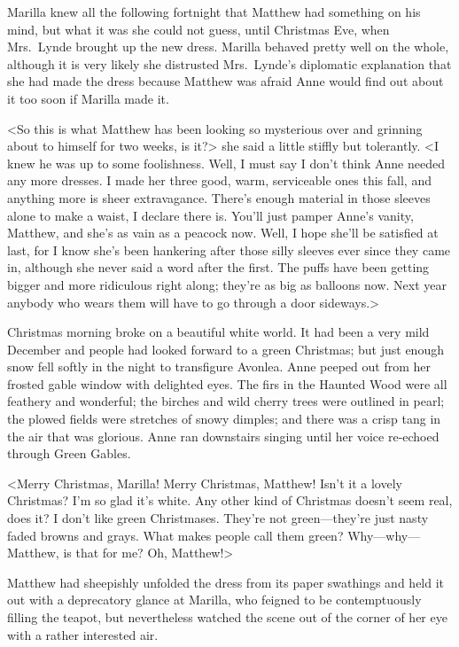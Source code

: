 Marilla knew all the following fortnight that Matthew had something on his mind, but what it was she could not guess, until Christmas Eve, when Mrs.~Lynde brought up the new dress. Marilla behaved pretty well on the whole, although it is very likely she distrusted Mrs.~Lynde's diplomatic explanation that she had made the dress because Matthew was afraid Anne would find out about it too soon if Marilla made it.

<So this is what Matthew has been looking so mysterious over and grinning about to himself for two weeks, is it?> she said a little stiffly but tolerantly. <I knew he was up to some foolishness. Well, I must say I don't think Anne needed any more dresses. I made her three good, warm, serviceable ones this fall, and anything more is sheer extravagance. There's enough material in those sleeves alone to make a waist, I declare there is. You'll just pamper Anne's vanity, Matthew, and she's as vain as a peacock now. Well, I hope she'll be satisfied at last, for I know she's been hankering after those silly sleeves ever since they came in, although she never said a word after the first. The puffs have been getting bigger and more ridiculous right along; they're as big as balloons now. Next year anybody who wears them will have to go through a door sideways.>

Christmas morning broke on a beautiful white world. It had been a very mild December and people had looked forward to a green Christmas; but just enough snow fell softly in the night to transfigure Avonlea. Anne peeped out from her frosted gable window with delighted eyes. The firs in the Haunted Wood were all feathery and wonderful; the birches and wild cherry trees were outlined in pearl; the plowed fields were stretches of snowy dimples; and there was a crisp tang in the air that was glorious. Anne ran downstairs singing until her voice re-echoed through Green Gables.

<Merry Christmas, Marilla! Merry Christmas, Matthew! Isn't it a lovely Christmas? I'm so glad it's white. Any other kind of Christmas doesn't seem real, does it? I don't like green Christmases. They're not green—they're just nasty faded browns and grays. What makes people call them green? Why—why—Matthew, is that for me? Oh, Matthew!>

Matthew had sheepishly unfolded the dress from its paper swathings and held it out with a deprecatory glance at Marilla, who feigned to be contemptuously filling the teapot, but nevertheless watched the scene out of the corner of her eye with a rather interested air.

